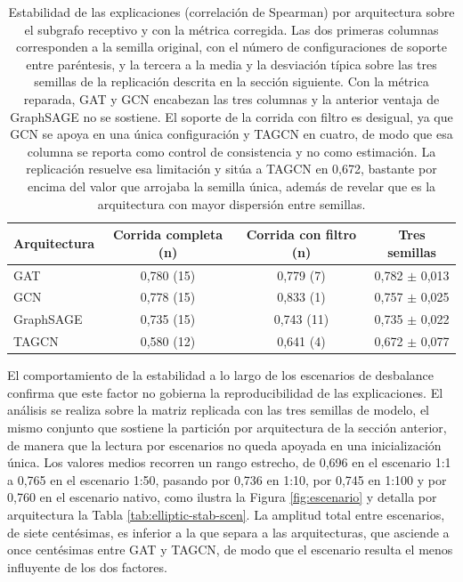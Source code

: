 \begin{table}[htbp]
    \centering
    \renewcommand{\arraystretch}{1.3}
    \begin{tabular}{lccc}
    \toprule
    \textbf{Arquitectura} & \textbf{Corrida completa (n)} & \textbf{Corrida con filtro (n)} & \textbf{Tres semillas} \\
    \midrule
    GAT       & 0,780 (15) & 0,779 (7)  & 0,782 $\pm$ 0,013 \\
    GCN       & 0,778 (15) & 0,833 (1)  & 0,757 $\pm$ 0,025 \\
    GraphSAGE & 0,735 (15) & 0,743 (11) & 0,735 $\pm$ 0,022 \\
    TAGCN     & 0,580 (12) & 0,641 (4)  & 0,672 $\pm$ 0,077 \\
    \bottomrule
    \end{tabular}
    \caption{Estabilidad de las explicaciones (correlación de Spearman) por arquitectura sobre el subgrafo receptivo y con la métrica corregida. Las dos primeras columnas corresponden a la semilla original, con el número de configuraciones de soporte entre paréntesis, y la tercera a la media y la desviación típica sobre las tres semillas de la replicación descrita en la sección siguiente. Con la métrica reparada, GAT y GCN encabezan las tres columnas y la anterior ventaja de GraphSAGE no se sostiene. El soporte de la corrida con filtro es desigual, ya que GCN se apoya en una única configuración y TAGCN en cuatro, de modo que esa columna se reporta como control de consistencia y no como estimación. La replicación resuelve esa limitación y sitúa a TAGCN en 0,672, bastante por encima del valor que arrojaba la semilla única, además de revelar que es la arquitectura con mayor dispersión entre semillas.}
    \label{tab:ranking}
\end{table}

El comportamiento de la estabilidad a lo largo de los escenarios de desbalance confirma que este factor no gobierna la reproducibilidad de las explicaciones. El análisis se realiza sobre la matriz replicada con las tres semillas de modelo, el mismo conjunto que sostiene la partición por arquitectura de la sección anterior, de manera que la lectura por escenarios no queda apoyada en una inicialización única. Los valores medios recorren un rango estrecho, de 0,696 en el escenario 1:1 a 0,765 en el escenario 1:50, pasando por 0,736 en 1:10, por 0,745 en 1:100 y por 0,760 en el escenario nativo, como ilustra la Figura \ref{fig:escenario} y detalla por arquitectura la Tabla \ref{tab:elliptic-stab-scen}. La amplitud total entre escenarios, de siete centésimas, es inferior a la que separa a las arquitecturas, que asciende a once centésimas entre GAT y TAGCN, de modo que el escenario resulta el menos influyente de los dos factores.

